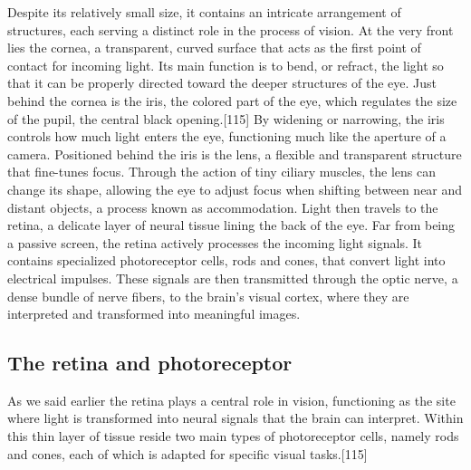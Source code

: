 \documentclass[12pt]{report}
\begin{document}
Despite its relatively small size, it contains an intricate arrangement of structures, each serving a distinct role in the process of vision.
At the very front lies the cornea, a transparent, curved surface that acts as the first point of contact for incoming light. 
Its main function is to bend, or refract, the light so that it can be properly directed toward the deeper structures of the eye.
Just behind the cornea is the iris, the colored part of the eye, which regulates the size of the pupil, the central black opening.[115] 
By widening or narrowing, the iris controls how much light enters the eye, functioning much like the aperture of a camera.
Positioned behind the iris is the lens, a flexible and transparent structure that fine-tunes focus. 
Through the action of tiny ciliary muscles, the lens can change its shape, allowing the eye to adjust focus when shifting between near and distant objects, a process known as accommodation.
Light then travels to the retina, a delicate layer of neural tissue lining the back of the eye. 
Far from being a passive screen, the retina actively processes the incoming light signals. 
It contains specialized photoreceptor cells, rods and cones, that convert light into electrical impulses. 
These signals are then transmitted through the optic nerve, a dense bundle of nerve fibers, to the brain's visual cortex, where they are interpreted and transformed into meaningful images.

\subsection{The retina and photoreceptor}

As we said earlier the retina plays a central role in vision, functioning as the site where light is transformed into neural signals that the brain can interpret. 
Within this thin layer of tissue reside two main types of photoreceptor cells, namely rods and cones, each of which is adapted for specific visual tasks.[115]
\end{document}
